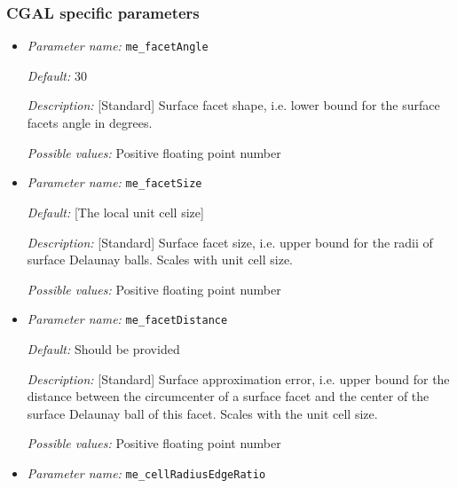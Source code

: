 \subsubsection{CGAL specific parameters} \label{parameters:cgal}
\begin{itemize}
	\item {\it Parameter name:} {\tt me\_facetAngle}
	\label{parameters:me_facetAngle}
	
	
	{\it Default:} 30
	
	{\it Description:} [Standard] Surface facet shape, i.e. lower bound for the surface facets angle in degrees.
	
	{\it Possible values:} Positive floating point number 
	
	\item {\it Parameter name:} {\tt me\_facetSize}
	\label{parameters:me_facetSize}
	
	
	{\it Default:} [The local unit cell size]
	
	{\it Description:} [Standard] Surface facet size, i.e. upper bound for the radii of surface Delaunay balls. Scales with unit cell size.
	
	{\it Possible values:} Positive floating point number 
	
	\item {\it Parameter name:} {\tt me\_facetDistance}
	\label{parameters:me_facetDistance}
	
	
	{\it Default:} Should be provided
	
	{\it Description:} [Standard] Surface approximation error, i.e. upper bound for the distance between the circumcenter of a surface facet and the center of the surface Delaunay ball of this facet. Scales with the unit cell size.
	
	{\it Possible values:} Positive floating point number 
	
	\item {\it Parameter name:} {\tt me\_cellRadiusEdgeRatio}
	\label{parameters:me_cellRadiusEdgeRatio}
	

\end{itemize}
